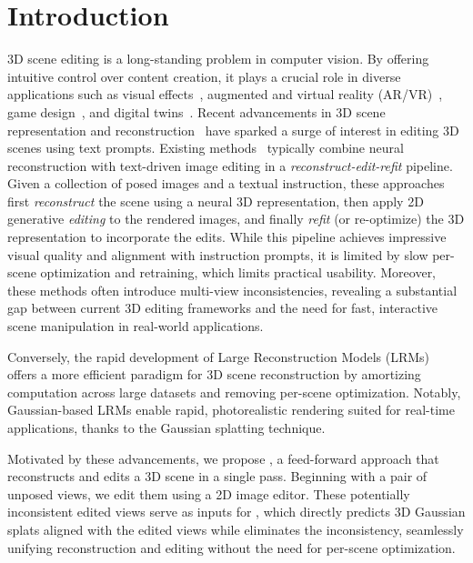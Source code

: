 \vspace{-2mm}
\section{Introduction}
\label{sec:intro}
3D scene editing is a long-standing problem in computer vision. By offering intuitive control over content creation, it plays a crucial role in diverse applications such as visual effects~\cite{zhang2025advancing3dgaussiansplatting}, augmented and virtual reality (AR/VR)~\cite{madhavaram2024trainingfreeapproach3d}, game design~\cite{xu2024sketch2sceneautomaticgenerationinteractive}, and digital twins~\cite{melnik2025digitaltwingenerationvisual}.
%
Recent advancements in 3D scene representation and reconstruction~\cite{nerf, 3dgs} have sparked a surge of interest in editing 3D scenes using text prompts. Existing methods~\cite{in2n, gaussctrl, lee2025editsplatmultiviewfusionattentionguided} typically combine neural reconstruction with text-driven image editing in a \textit{reconstruct-edit-refit} pipeline. Given a collection of posed images and a textual instruction, these approaches first \textit{reconstruct} the scene using a neural 3D representation, then apply 2D generative \textit{editing} to the rendered images, and finally \textit{refit} (or re-optimize) the 3D representation to incorporate the edits.
%
While this pipeline achieves impressive visual quality and alignment with instruction prompts, it is limited by slow per-scene optimization and retraining, which limits practical usability. Moreover, these methods often introduce multi-view inconsistencies, revealing a substantial gap between current 3D editing frameworks and the need for fast, interactive scene manipulation in real-world applications.

Conversely, the rapid development of Large Reconstruction Models (LRMs)~\cite{lrm, gslrm, noposplat, mvsnerf, pixelsplat, dust3r} offers a more efficient paradigm for 3D scene reconstruction by amortizing computation across large datasets and removing per-scene optimization. Notably, Gaussian-based LRMs enable rapid, photorealistic rendering suited for real-time applications, thanks to the Gaussian splatting technique.

Motivated by these advancements, we propose {\ourmethod}, a feed-forward approach that reconstructs and edits a 3D scene in a single pass.
%
Beginning with a pair of unposed views, we edit them using a 2D image editor. These potentially inconsistent edited views serve as inputs for {\ourmethod}, which directly predicts 3D Gaussian splats aligned with the edited views while eliminates the inconsistency, seamlessly unifying reconstruction and editing without the need for per-scene optimization.

